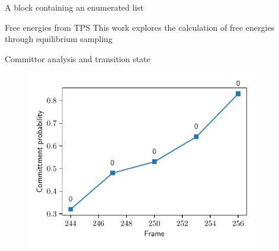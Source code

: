 \documentclass[final]{beamer}
\newlength{\sepwidth}
\newlength{\colwidth}
\newcommand{\separatorcolumn}{\begin{column}{\sepwidth}\end{column}}
\begin{document}
\begin{frame}[t]
\begin{columns}[t]
\begin{column}{\colwidth}
\begin{block}{A block containing an enumerated list}
  \end{block}

  \begin{block}{Free energies from TPS}
This work explores the calculation of free energies through equilibrium sampling \cite{Balasubramani22JPhysChemB126p5413}

  \end{block}

  \begin{block}{Committor analysis and transition state}
\begin{figure}
\includegraphics[scale=1.0]{figures/dist120.pdf}
\end{figure}
  \end{block}

\end{column}

\separatorcolumn

\begin{column}{\colwidth}


\end{column}
\end{columns}
\end{frame}
\end{document}
